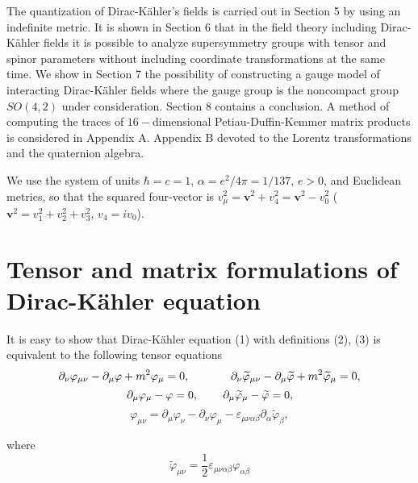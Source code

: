 \documentclass[a4paper,12pt]{article}
\begin{document}
The quantization of Dirac-K\"ahler's fields is carried out in Section 5 by
using an indefinite metric. It is shown in Section 6 that in the field
theory including Dirac-K\"ahler fields it is possible to analyze
supersymmetry groups with tensor and spinor parameters without including
coordinate transformations at the same time. We show in Section 7 the
possibility of constructing a gauge model of interacting Dirac-K\"ahler
fields where the gauge group is the noncompact group $SO(4,2)$ under
consideration. Section 8 contains a conclusion. A method of computing the
traces of $16-$dimensional Petiau-Duffin-Kemmer matrix products is
considered in Appendix A. Appendix B devoted to the Lorentz transformations
and the quaternion algebra.

We use the system of units $\hbar =c=1$, $\alpha =e^2/4\pi
=1/137$, $e>0$, and Euclidean metrics, so that the squared
four-vector is $v_\mu ^2=\mathbf{v }^2+v_4^2=\mathbf{v}^2-v_0^2$
($\mathbf{v}^2=v_1^2+v_2^2+v_3^2$, $v_4=iv_0$).

\section{Tensor and matrix formulations of Dirac-K\"ahler
equation}

It is easy to show that Dirac-K\"ahler equation (1) with definitions (2),
(3) is equivalent to the following tensor equations
\begin{equation}
\partial _\nu \varphi _{\mu \nu }-\partial _\mu \varphi +m^2\varphi _\mu
=0 ,\hspace{0.5in}\partial _\nu \widetilde{\varphi }_{\mu \nu
}-\partial _\mu \widetilde{\varphi }+m^2\widetilde{\varphi }_\mu
=0  ,\label{5}
\end{equation}
\begin{equation}
\partial _\mu \varphi _\mu -\varphi =0 ,\hspace{0.3in}\partial _\mu \widetilde{
\varphi }_\mu -\widetilde{\varphi }=0 , \label{6}
\end{equation}
\begin{equation}
\varphi _{\mu \nu }=\partial _\mu \varphi _\nu -\partial _\nu
\varphi _\mu -\varepsilon _{\mu \nu \alpha \beta }\partial _\alpha
\widetilde{\varphi } _\beta , \label{7}
\end{equation}

where
\begin{equation}
\widetilde{\varphi }_{\mu \nu }=\frac 12\varepsilon _{\mu \nu \alpha \beta
}\varphi _{\alpha \beta }  \label{8}
\end{equation}
\end{document}
